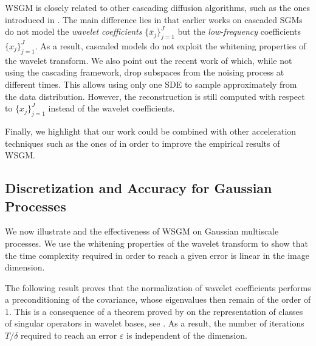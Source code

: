 \documentclass{article}
\begin{document}
WSGM is closely related to other cascading diffusion algorithms, such as the ones
introduced in \cite{ho2022cascaded,saharia2021image,nichol2021beatgans}. The
main difference lies in that earlier works on cascaded SGMs do not model the
\emph{wavelet coefficients} $\{\bar{x}_j\}_{j=1}^J$ but the \emph{low-frequency}
coefficients $\{x_j\}_{j=1}^J$. As a result, cascaded models do not exploit the
whitening properties of the wavelet transform.   We
also point out the recent work of \cite{jing2022subspace} which, while not using
the cascading framework, drop subspaces from the noising process at different
times. This allows using only one SDE to sample approximately from the data
distribution. However, the reconstruction is still computed with respect to
$\{x_j\}_{j=1}^J$ instead of the wavelet coefficients. 



Finally, we highlight that our work could be combined with other acceleration
techniques such as the ones of
\cite{jolicoeur2021gotta,liu2022pseudo,zhang2022exponential,
  san2021noise,nachmani2021non,song2020denoising,ho2020denoising,kong2021fast,luhman2021knowledge,salimans2022progressive,xiao2021tackling}
in order to improve the empirical results of WSGM.


\subsection{Discretization and Accuracy for Gaussian Processes}
\label{sec:time-sampl-accur}
We now illustrate  and the effectiveness of WSGM on Gaussian multiscale processes.  We use the
whitening properties of the wavelet transform to show that the time
complexity required in order to reach a given error is linear in the image dimension.

The following result proves that the normalization of wavelet coefficients
performs a preconditioning of the covariance, whose eigenvalues then remain of the
order of $1$. This is a consequence of a theorem proved by \cite{Meyer:92c} on
the representation of classes of singular operators in wavelet bases, see
. As a result, the number of iterations $T/\delta$ required to reach an error $\varepsilon$ is independent of the dimension.
\end{document}
